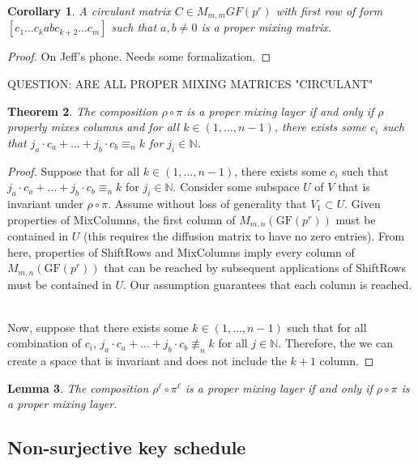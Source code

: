 \documentclass[11pt]{amsart}
\newcommand{\naturals}{{\mathbb N}}
\newcommand{\GF}{\mathrm{GF}}
\newtheorem{theorem}{{\bf Theorem }}
\newtheorem{lemma}[theorem]{{\bf Lemma }}
\newtheorem{corollary}[theorem]{{\bf Corollary}}
\begin{document}
\begin{corollary}
A circulant matrix $C \in M_{m,m} GF(p^r)$ with first row of form $[c_1 \dots c_k a b c_{k+2} \dots c_m]$ such that $a,b \neq 0$ is a proper mixing matrix.
\end{corollary}
\begin{proof}
On Jeff's phone. Needs some formalization.
\end{proof}

QUESTION: ARE ALL PROPER MIXING MATRICES "CIRCULANT"

\begin{theorem}
The composition $\rho \circ \pi$ is a proper mixing layer if and only if $\rho$ properly mixes columns and for all $k \in (1,\dots,n-1)$, there exists some $c_i$ such that $j_a \cdot c_a + \dots + j_b \cdot c_b \equiv_n k$ for $j_i \in \naturals$.
\end{theorem}
\begin{proof}
Suppose that for all $k \in (1,\dots,n-1)$, there exists some $c_i$ such that $j_a \cdot c_a + \dots + j_b \cdot c_b \equiv_n k$ for $j_i \in \naturals$. Consider some subspace $U$ of $V$ that is invariant under $\rho \circ \pi$. Assume without loss of generality that $V_1 \subset U$. Given properties of MixColumns, the first column of $M_{m,n}(\GF(p^r))$ must be contained in $U$ (this requires the diffusion matrix to have no zero entries). From here, properties of ShiftRows and MixColumns imply every column of $M_{m,n}(\GF(p^r))$ that can be reached by subsequent applications of ShiftRows must be contained in $U$. Our assumption guarantees that each column is reached. \

Now, suppose that there exists some $k \in (1,\dots,n-1)$ such that for all combination of $c_i$, $j_a \cdot c_a + \dots + j_b \cdot c_b \not\equiv_n k$ for all $j \in \naturals$. Therefore, the we can create a space that is invariant and does not include the $k+1$ column.
\end{proof}


\begin{lemma}
The composition $\rho^\ell \circ \pi^\ell$ is a proper mixing layer if and only if $\rho \circ \pi$ is a proper mixing layer.
\end{lemma}










\subsection{Non-surjective key schedule} \
\end{document}
